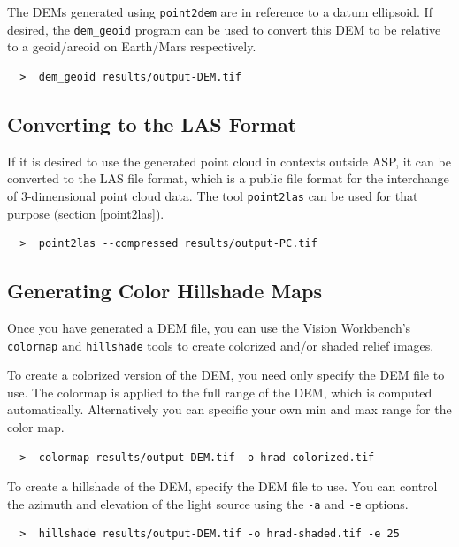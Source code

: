 The DEMs generated using \texttt{point2dem} are in reference to a datum
ellipsoid. If desired, the \texttt{dem\_geoid} program can be used to
convert this DEM to be relative to a geoid/areoid on Earth/Mars
respectively.

\begin {verbatim}
  >  dem_geoid results/output-DEM.tif 
\end{verbatim}

\subsection{Converting to the LAS Format}

If it is desired to use the generated point cloud in contexts outside
ASP, it can be converted to the LAS file format, which is a public file
format for the interchange of 3-dimensional point cloud data. The tool
\texttt{point2las} can be used for that purpose (section \ref{point2las}).

\begin {verbatim}
  >  point2las --compressed results/output-PC.tif 
\end{verbatim}

\subsection{Generating Color Hillshade Maps}

Once you have generated a \ac{DEM} file, you can use the Vision Workbench's
\texttt{colormap} and \texttt{hillshade} tools to create colorized
and/or shaded relief images.

To create a colorized version of the \ac{DEM}, you need only specify
the \ac{DEM} file to use. The colormap is applied to the full range of
the DEM, which is computed automatically.  Alternatively you can
specific your own min and max range for the color map.

\begin{verbatim}
  >  colormap results/output-DEM.tif -o hrad-colorized.tif
\end{verbatim}

To create a hillshade of the \ac{DEM}, specify the \ac{DEM} file to
use. You can control the azimuth and elevation of the light source
using the \texttt{-a} and \texttt{-e} options.

\begin{verbatim}
  >  hillshade results/output-DEM.tif -o hrad-shaded.tif -e 25
\end{verbatim}

